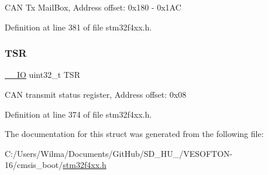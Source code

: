 C\+AN Tx Mail\+Box, Address offset\+: 0x180 -\/ 0x1\+AC 

Definition at line 381 of file stm32f4xx.\+h.

\mbox{\label{struct_c_a_n___type_def_a87e3001757a0cd493785f1f3337dd0e8}} 
\subsubsection{\texorpdfstring{T\+SR}{TSR}}
{\footnotesize\ttfamily \hyperlink{group___c_m_s_i_s__core__definitions_gaec43007d9998a0a0e01faede4133d6be}{\+\_\+\+\_\+\+IO} uint32\+\_\+t T\+SR}

C\+AN transmit status register, Address offset\+: 0x08 

Definition at line 374 of file stm32f4xx.\+h.



The documentation for this struct was generated from the following file\+:\begin{DoxyCompactItemize}
\item 
C\+:/\+Users/\+Wilma/\+Documents/\+Git\+Hub/\+S\+D\+\_\+\+H\+U\+\_/\+V\+E\+S\+O\+F\+T\+O\+N-\/16/cmsis\+\_\+boot/\hyperlink{stm32f4xx_8h}{stm32f4xx.\+h}\end{DoxyCompactItemize}
